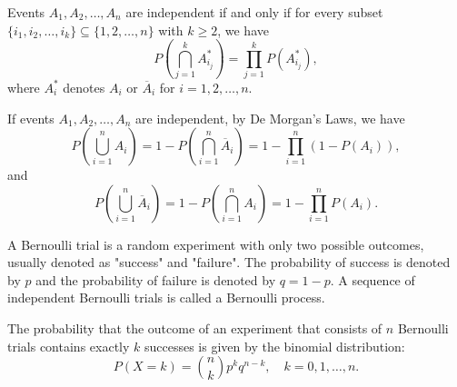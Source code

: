 \begin{theorem}
  Events \(A_1, A_2, \dots, A_n\) are independent if and only if for every subset \(\{i_1, i_2, \dots, i_k\} \subseteq \{1, 2, \dots, n\}\) with \(k \geq 2\), we have
  \[
    P\left(\bigcap_{j=1}^k A_{i_j}^*\right) = \prod_{j=1}^k P(A_{i_j}^*),
  \]
  where \(A_i^*\) denotes \(A_i\) or \(\overline{A}_i\) for \(i = 1, 2, \dots, n\).
\end{theorem}

If events \(A_1, A_2, \dots, A_n\) are independent, by De Morgan's Laws, we have
\[
  P\left(\bigcup_{i=1}^n A_i\right) = 1 - P\left(\bigcap_{i=1}^n \overline{A}_i\right) = 1 - \prod_{i=1}^n (1 - P(A_i)),
\]
and
\[
  P\left(\bigcup_{i=1}^n \overline{A}_i\right) = 1 - P\left(\bigcap_{i=1}^n A_i\right) = 1 - \prod_{i=1}^n P(A_i).
\]

\begin{definition}
  A Bernoulli trial is a random experiment with only two possible outcomes, usually denoted as "success" and "failure". The probability of success is denoted by \(p\) and the probability of failure is denoted by \(q = 1 - p\). A sequence of independent Bernoulli trials is called a Bernoulli process.
\end{definition}

\begin{theorem}
  The probability that the outcome of an experiment that consists of \(n\) Bernoulli trials contains exactly \(k\) successes is given by the binomial distribution:
  \[
    P(X = k) = \binom{n}{k} p^k q^{n-k}, \quad k = 0, 1, \dots, n.
  \]
\end{theorem}